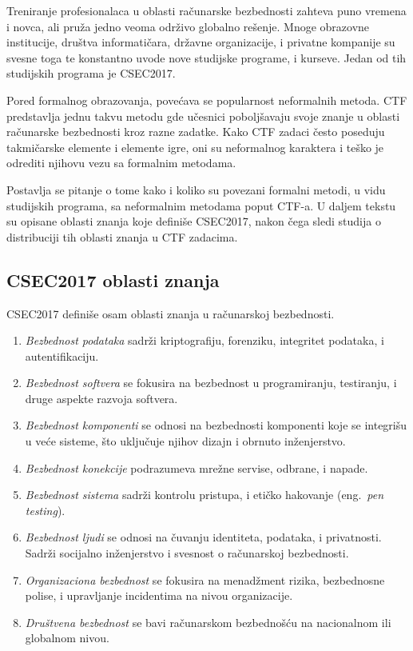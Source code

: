 \documentclass[12pt, a4paper, twocolumn]{article}
\begin{document}
Treniranje profesionalaca u oblasti računarske bezbednosti zahteva puno 
vremena i novca, ali pruža jedno veoma održivo globalno rešenje. Mnoge 
obrazovne institucije, društva informatičara, državne organizacije, i privatne
kompanije su svesne toga te konstantno uvode nove studijske programe, 
i kurseve. Jedan od tih studijskih programa je CSEC2017. \cite{ctf_csec}

Pored formalnog obrazovanja, povećava se popularnost neformalnih metoda.
CTF predstavlja jednu takvu metodu gde učesnici poboljšavaju svoje znanje u
oblasti računarske bezbednosti kroz razne zadatke. Kako CTF zadaci često 
poseduju takmičarske elemente i elemente igre, oni su neformalnog karaktera
i teško je odrediti njihovu vezu sa formalnim metodama.

Postavlja se pitanje o tome kako i koliko su povezani formalni metodi,
u vidu studijskih programa, sa neformalnim metodama poput CTF-a. U daljem 
tekstu su opisane oblasti znanja koje definiše CSEC2017, nakon čega sledi 
studija o distribuciji tih oblasti znanja u CTF zadacima.

\subsection{CSEC2017 oblasti znanja}

CSEC2017 definiše osam oblasti znanja u računarskoj bezbednosti.
\begin{enumerate}
    \item \emph{Bezbednost podataka} sadrži kriptografiju, forenziku, 
        integritet podataka, i autentifikaciju.
    \item \emph{Bezbednost softvera} se fokusira na bezbednost u 
        programiranju, testiranju, i druge aspekte razvoja softvera.
    \item \emph{Bezbednost komponenti} se odnosi na bezbednosti komponenti 
        koje se integrišu u veće sisteme, što uključuje njihov dizajn i 
        obrnuto inženjerstvo.
    \item \emph{Bezbednost konekcije} podrazumeva mrežne servise, odbrane, i 
        napade.
    \item \emph{Bezbednost sistema} sadrži kontrolu pristupa, i etičko 
        hakovanje (eng.\ \emph{pen testing}).
    \item \emph{Bezbednost ljudi} se odnosi na čuvanju identiteta, podataka, 
        i privatnosti. Sadrži socijalno inženjerstvo i svesnost o računarskoj 
        bezbednosti.
    \item \emph{Organizaciona bezbednost} se fokusira na menadžment rizika, 
        bezbednosne polise, i upravljanje incidentima na nivou organizacije.
    \item \emph{Društvena bezbednost} se bavi računarskom bezbednošću 
        na nacionalnom ili globalnom nivou.
\end{enumerate}
\end{document}

